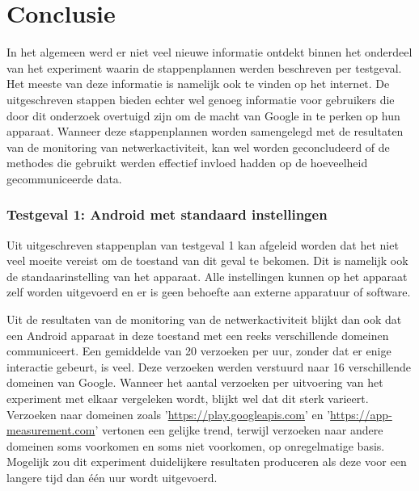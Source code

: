 
\chapter{Conclusie}
\label{ch:conclusie}


In het algemeen werd er niet veel nieuwe informatie ontdekt binnen het onderdeel van het experiment waarin de stappenplannen werden beschreven per testgeval. Het meeste van deze informatie is namelijk ook te vinden op het internet. De uitgeschreven stappen bieden echter wel genoeg informatie voor gebruikers die door dit onderzoek overtuigd zijn om de macht van Google in te perken op hun apparaat. Wanneer deze stappenplannen worden samengelegd met de resultaten van de monitoring van netwerkactiviteit, kan wel worden geconcludeerd of de methodes die gebruikt werden effectief invloed hadden op de hoeveelheid gecommuniceerde data.

\subsection{Testgeval 1: Android met standaard instellingen}
Uit uitgeschreven stappenplan van testgeval 1 kan afgeleid worden dat het niet veel moeite vereist om de toestand van dit geval te bekomen. Dit is namelijk ook de standaarinstelling van het apparaat. Alle instellingen kunnen op het apparaat zelf worden uitgevoerd en er is geen behoefte aan externe apparatuur of software. 

Uit de resultaten van de monitoring van de netwerkactiviteit blijkt dan ook dat een Android apparaat in deze toestand met een reeks verschillende domeinen communiceert. Een gemiddelde van 20 verzoeken per uur, zonder dat er enige interactie gebeurt, is veel. Deze verzoeken werden verstuurd naar 16 verschillende domeinen van Google. Wanneer het aantal verzoeken per uitvoering van het experiment met elkaar vergeleken wordt, blijkt wel dat dit sterk varieert. Verzoeken naar domeinen zoals '\url{https://play.googleapis.com}' en '\url{https://app-measurement.com}' vertonen een gelijke trend, terwijl verzoeken naar andere domeinen soms voorkomen en soms niet voorkomen, op onregelmatige basis. Mogelijk zou dit experiment duidelijkere resultaten produceren als deze voor een langere tijd dan één uur wordt uitgevoerd.

